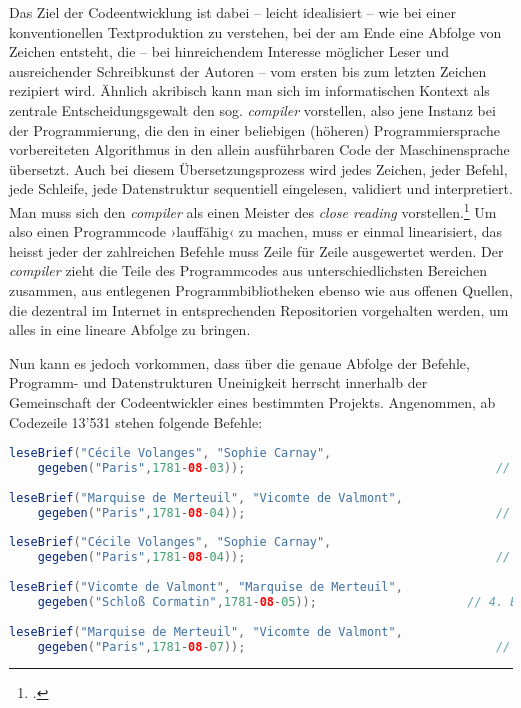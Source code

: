 \documentclass[a4paper,11pt]{article}
\newcommand{\inanf}[1]{›#1‹}
\begin{document}
Das Ziel der Codeentwicklung ist dabei – leicht idealisiert – wie bei einer konventionellen Textproduktion zu verstehen, bei der am Ende eine Abfolge von Zeichen entsteht, die – bei hinreichendem Interesse möglicher Leser und ausreichender Schreibkunst der Autoren – vom ersten bis zum letzten Zeichen rezipiert wird. Ähnlich akribisch kann man sich im informatischen Kontext als zentrale Entscheidungsgewalt den sog. \emph{compiler} vorstellen, also jene Instanz bei der Programmierung, die den in einer beliebigen (höheren) Programmiersprache vorbereiteten Algorithmus in den allein ausführbaren Code der Maschinensprache übersetzt. Auch bei diesem Übersetzungsprozess wird jedes Zeichen, jeder Befehl, jede Schleife, jede Datenstruktur sequentiell eingelesen, validiert und interpretiert. Man muss sich den \emph{compiler} als einen Meister des \emph{close reading} vorstellen.\footcite[\inanf{Close Reading} bezeichnet dabei nicht allein eine Lesetechnik im Poststrukturalismus, sondern bezieht sich ebenso auf die kodifizierende Funktion beim Programmieren, das Schliessen des Codes, das vom Compiler vorgenommen wird, vgl.][]{krajewski+vismann:2009} Um also einen Programmcode \inanf{lauffähig} zu machen, muss er einmal linearisiert, das heisst jeder der zahlreichen Befehle muss Zeile für Zeile ausgewertet werden. Der \emph{compiler} zieht die Teile des Programmcodes aus unterschiedlichsten Bereichen zusammen, aus entlegenen Programmbibliotheken ebenso wie aus offenen Quellen, die dezentral im Internet in entsprechenden Repositorien vorgehalten werden, um alles in eine lineare Abfolge zu bringen. 

Nun kann es jedoch vorkommen, dass über die genaue Abfolge der Befehle, Programm- und Datenstrukturen Uneinigkeit herrscht innerhalb der Gemeinschaft der Codeentwickler eines bestimmten Projekts. Angenommen, ab Codezeile 13'531 stehen folgende Befehle:
\begin{lstlisting}[language=Java, firstnumber=13531]
leseBrief("Cécile Volanges", "Sophie Carnay", 
	gegeben("Paris",1781-08-03));                           		// 1. Brief
	
leseBrief("Marquise de Merteuil", "Vicomte de Valmont", 
	gegeben("Paris",1781-08-04));                           		// 2. Brief
	
leseBrief("Cécile Volanges", "Sophie Carnay", 
	gegeben("Paris",1781-08-04));                           		// 3. Brief
	
leseBrief("Vicomte de Valmont", "Marquise de Merteuil", 
	gegeben("Schloß Cormatin",1781-08-05));                 	// 4. Brief
	
leseBrief("Marquise de Merteuil", "Vicomte de Valmont", 
	gegeben("Paris",1781-08-07));                           		// 5. Brief
\end{lstlisting}
\end{document}
